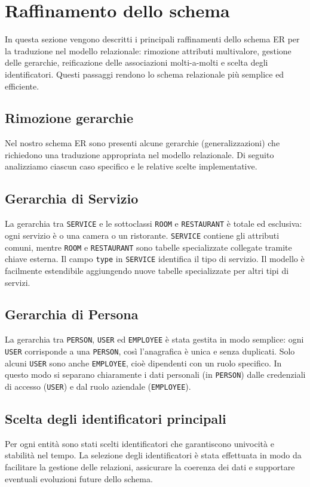 \documentclass[a4paper,12pt]{report}
\begin{document}
\newpage
\section{Raffinamento dello schema}
In questa sezione vengono descritti i principali raffinamenti dello
schema ER per la traduzione nel modello relazionale: rimozione
attributi multivalore, gestione delle gerarchie, reificazione delle
associazioni molti-a-molti e scelta degli identificatori. Questi
passaggi rendono lo schema relazionale più semplice ed efficiente.

\subsection{Rimozione gerarchie}
Nel nostro schema ER sono presenti alcune gerarchie
(generalizzazioni) che richiedono una traduzione appropriata nel
modello relazionale. Di seguito analizziamo ciascun caso specifico e
le relative scelte implementative.

\subsection*{Gerarchia di Servizio}
La gerarchia tra \texttt{SERVICE} e le sottoclassi \texttt{ROOM} e
\texttt{RESTAURANT} è totale
ed esclusiva: ogni servizio è o una camera o un ristorante. \texttt{SERVICE}
contiene gli attributi comuni, mentre \texttt{ROOM} e
\texttt{RESTAURANT} sono tabelle
specializzate collegate tramite chiave esterna. Il campo
\texttt{type} in \texttt{SERVICE} identifica il tipo di servizio. Il modello è
facilmente estendibile aggiungendo nuove tabelle specializzate per
altri tipi di servizi.

\subsection*{Gerarchia di Persona}
La gerarchia tra \texttt{PERSON}, \texttt{USER} ed \texttt{EMPLOYEE}
è stata gestita in modo semplice: ogni \texttt{USER} corrisponde a
una \texttt{PERSON}, così l'anagrafica è unica e senza duplicati.
Solo alcuni \texttt{USER} sono anche \texttt{EMPLOYEE}, cioè
dipendenti con un ruolo specifico. In questo modo si separano
chiaramente i dati personali (in \texttt{PERSON}) dalle credenziali
di accesso (\texttt{USER}) e dal ruolo aziendale (\texttt{EMPLOYEE}).

\subsection{Scelta degli identificatori principali}
Per ogni entità sono stati scelti identificatori che garantiscono
univocità e stabilità nel tempo. La selezione degli identificatori è
stata effettuata in modo da facilitare la gestione delle relazioni,
assicurare la coerenza dei dati e supportare eventuali evoluzioni
future dello schema.
\end{document}
